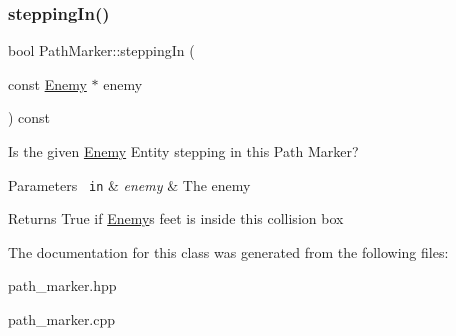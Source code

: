 \subsubsection{\texorpdfstring{steppingIn()}{steppingIn()}}
{\footnotesize\ttfamily bool Path\+Marker\+::stepping\+In (\begin{DoxyParamCaption}\item[{const \mbox{\hyperlink{class_enemy}{Enemy}} $\ast$}]{enemy }\end{DoxyParamCaption}) const}



Is the given \mbox{\hyperlink{class_enemy}{Enemy}} Entity stepping in this Path Marker? 


\begin{DoxyParams}[1]{Parameters}
\mbox{\texttt{ in}}  & {\em enemy} & The enemy\\
\hline
\end{DoxyParams}
\begin{DoxyReturn}{Returns}
True if \mbox{\hyperlink{class_enemy}{Enemy}}\textquotesingle{}s feet is inside this collision box 
\end{DoxyReturn}


The documentation for this class was generated from the following files\+:\begin{DoxyCompactItemize}
\item 
path\+\_\+marker.\+hpp\item 
path\+\_\+marker.\+cpp\end{DoxyCompactItemize}
